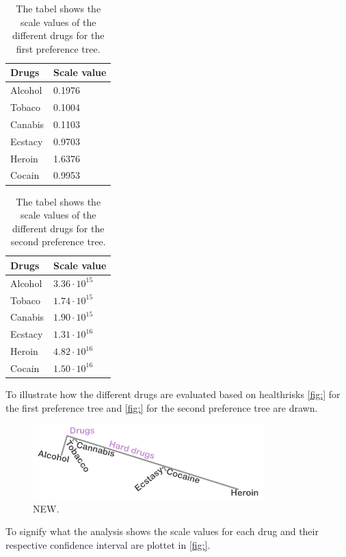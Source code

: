 % 
\begin{table}[H]
	\centering
	\begin{tabular}{@{}ll@{}}
		\toprule
		Drugs     & Scale value \\ \midrule
		Alcohol	  & 0.1976   \\
		Tobaco	  & 0.1004   \\
		Canabis	  & 0.1103   \\
		Ecstacy	  & 0.9703   \\
		Heroin	  & 1.6376   \\
		Cocain	  & 0.9953   \\	\bottomrule
	\end{tabular}
	\caption{The tabel shows the scale values of the different drugs for the first preference tree.}
	\label{tab:ScaleValues1}
\end{table} 
\noindent 
%

\begin{table}[H]
	\centering
	\begin{tabular}{@{}ll@{}}
		\toprule
		Drugs     & Scale value \\ \midrule
		Alcohol	  & $3.36\cdot10^{15}$   \\
		Tobaco	  & $1.74\cdot10^{15}$   \\
		Canabis	  & $1.90\cdot10^{15}$   \\
		Ecstacy	  & $1.31\cdot10^{16}$   \\
		Heroin	  & $4.82\cdot10^{16}$   \\
		Cocain	  & $1.50\cdot10^{16}$   \\	\bottomrule
	\end{tabular}
	\caption{The tabel shows the scale values of the different drugs for the second preference tree.}
	\label{tab:ScaleValues2}
\end{table} 
\noindent 
%
To illustrate how the different drugs are evaluated based on healthrisks \autoref{fig:} for the first preference tree and \autoref{fig:} for the second preference tree are drawn. 
%
\begin{figure}[H]
\centering
\includegraphics[width = 0.80\textwidth]{Figure/Tree1real}
\caption{NEW.}
\label{fig:Tree1real}
\end{figure}
\noindent
%
To signify what the analysis shows the scale values for each drug and their respective confidence interval are plottet in \autoref{fig:}.

